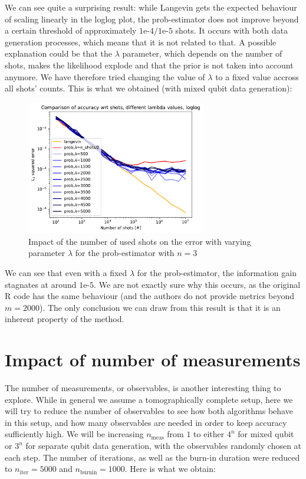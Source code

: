 \documentclass[12pt]{memoir}
\newcommand{\nitern}[1]{$n_{\text{iter}}=#1$}
\newcommand{\nburninn}[1]{$n_{\text{burnin}}=#1$}
\newcommand{\nmeas}[0]{$n_{\text{meas}} $ }
\begin{document}
We can see quite a surprising result: while Langevin gets the expected behaviour of scaling linearly in the loglog plot, the prob-estimator does not improve beyond a certain threshold of approximately $1\text{e-}4/1\text{e-}5$ shots. It occurs with both data generation processes, which means that it is not related to that. A possible explanation could be that the $\lambda$ parameter, which depends on the number of shots, makes the likelihood explode and that the prior is not taken into account anymore. We have therefore tried changing the value of $\lambda$ to a fixed value accross all shots' counts. This is what we obtained (with mixed qubit data generation):

\begin{figure}[H]
    \centering
    \includegraphics[width=0.7\textwidth]{figures/experiments/shots/shots_acc_comp_shots_exp_lambda_prob_with_var_lambda_loglog-1.png}
    \caption{Impact of the number of used shots on the error with varying parameter $\lambda$ for the prob-estimator with $n=3$}
    \label{fig:shots-comp-prob-var-lambda}
\end{figure}

We can see that even with a fixed $\lambda$ for the prob-estimator, the information gain stagnates at around $1\text{e-}5$. We are not exactly sure why this occurs, as the original R code has the same behaviour (and the authors do not provide metrics beyond $m=2000$). The only conclusion we can draw from this result is that it is an inherent property of the method.

\section{Impact of number of measurements}\label{section:comp-nb-meas}
The number of measurements, or observables, is another interesting thing to explore. While in general we assume a tomographically complete setup, here we will try to reduce the number of observables to see how both algorithms behave in this setup, and how many observables are needed in order to keep accuracy sufficiently high. We will be increasing \nmeas  from $1$ to either $4^n$ for mixed qubit or $3^n$ for separate qubit data generation, with the observables randomly chosen at each step. The number of iterations, as well as the burn-in duration were reduced to \nitern{5000} and \nburninn{1000}. Here is what we obtain:
\end{document}
